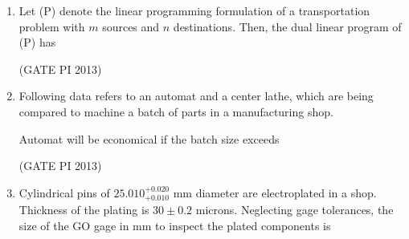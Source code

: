 \documentclass[journal,12pt,onecolumn]{IEEEtran}
\theoremstyle{remark}
\begin{document}
\begin{enumerate}
\item Let (P) denote the linear programming formulation of a transportation problem with $m$ sources and $n$ destinations. Then, the dual linear program of (P) has
\begin{enumerate}
\end{enumerate}

\hfill (GATE PI 2013)

\item Following data refers to an automat and a center lathe, which are being compared to machine a batch of parts in a manufacturing shop.

 

Automat will be economical if the batch size exceeds

\begin{enumerate}
\end{enumerate}

\hfill (GATE PI 2013)

\item Cylindrical pins of $25.010^{+0.020}_{+0.010}$ mm diameter are electroplated in a shop. Thickness of the plating is $30 \pm 0.2$ microns. Neglecting gage tolerances, the size of the GO gage in mm to inspect the plated components is \\

\begin{enumerate}
\end{enumerate}


\end{enumerate}
\end{document}
